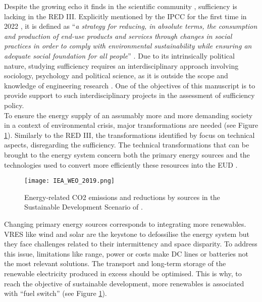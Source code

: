 Despite the growing echo it finds in the scientific community \cite{o2018good}, sufficiency is lacking in the RED III. Explicitly mentioned by the IPCC for the first time in 2022 \cite{IPCC2022}, it is defined as ``\emph{a strategy for reducing, in absolute terms, the consumption and production of end-use products and services through changes in social practices in order to comply with environmental sustainability while ensuring an adequate social foundation for all people}'' \cite{lage2023citizens}. Due to its intrinsically political nature, studying sufficiency requires an interdisciplinary approach involving sociology, psychology and political science, as it is outside the scope and knowledge of engineering research \cite{schmidt2015interdisciplinary}. One of the objectives of this manuscript is to provide support to such interdisciplinary projects in the assessment of sufficiency policy. \\

\noindent
To ensure the energy supply of an assumably more and more demanding society in a context of environmental crisis, major transformations are needed (see Figure \ref{fig:intro:IEA_WEO_2019}). Similarly to the RED III, the transformations identified by \citet{iea2020world} focus on technical aspects, disregarding the sufficiency.  The technical transformations that can be brought to the energy system concern both the primary energy sources and the technologies used to convert more efficiently these resources into the \gls{EUD} \cite{iea2020world,luderer2018residual}. 

\begin{figure}[ht!]
\centering
\texttt{[image: IEA\_WEO\_2019.png]}
\caption{Energy-related CO2 emissions and reductions by sources in the Sustainable Development Scenario of \citet{iea2020world}.}
\label{fig:intro:IEA_WEO_2019}
\end{figure}

Changing primary energy sources corresponds to integrating more renewables. \gls{VRES} like wind and solar are the keystone to defossilise the energy system but they face challenges related to their intermittency and space disparity.  To address this issue,  limitations like range, power or  costs make \gls{DC} lines or batteries not the most relevant solutions.  The transport and long-term storage of the renewable electricity produced in excess should be optimised.  This is why, to reach the objective of sustainable development, more renewables is associated with ``fuel switch'' (see Figure \ref{fig:intro:IEA_WEO_2019}). 

